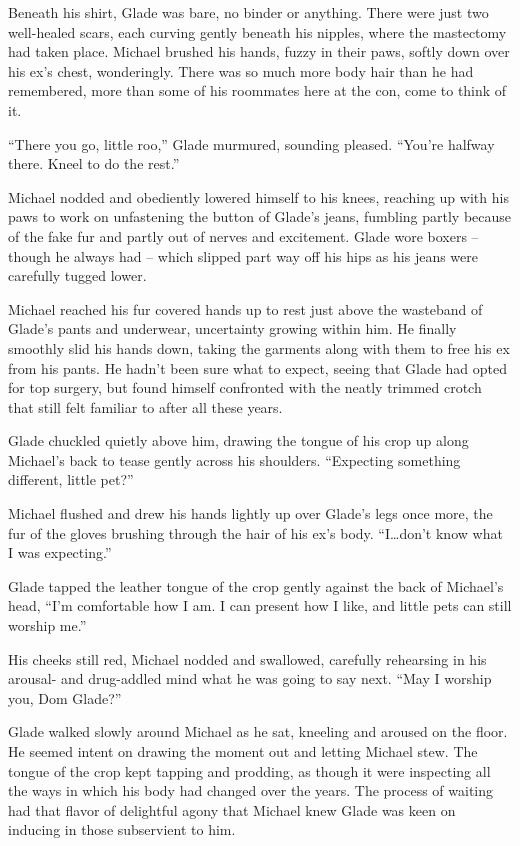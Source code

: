 \documentclass[12pt,letterpaper,oneside]{memoir}
\begin{document}
  Beneath his shirt, Glade was bare, no binder or anything.  There were just two well-healed scars, each curving gently beneath his nipples, where the mastectomy had taken place.  Michael brushed his hands, fuzzy in their paws, softly down over his ex's chest, wonderingly.  There was so much more body hair than he had remembered, more than some of his roommates here at the con, come to think of it.

  ``There you go, little roo,'' Glade murmured, sounding pleased.  ``You're halfway there.  Kneel to do the rest.''

  Michael nodded and obediently lowered himself to his knees, reaching up with his paws to work on unfastening the button of Glade's jeans, fumbling partly because of the fake fur and partly out of nerves and excitement.  Glade wore boxers -- though he always had -- which slipped part way off his hips as his jeans were carefully tugged lower.

  Michael reached his fur covered hands up to rest just above the wasteband of Glade's pants and underwear, uncertainty growing within him.  He finally smoothly slid his hands down, taking the garments along with them to free his ex from his pants.  He hadn't been sure what to expect, seeing that Glade had opted for top surgery, but found himself confronted with the neatly trimmed crotch that still felt familiar to after all these years.

  Glade chuckled quietly above him, drawing the tongue of his crop up along Michael's back to tease gently across his shoulders.  ``Expecting something different, little pet?''

  Michael flushed and drew his hands lightly up over Glade's legs once more, the fur of the gloves brushing through the hair of his ex's body.  ``I\ldots{}don't know what I was expecting.''

  Glade tapped the leather tongue of the crop gently against the back of Michael's head, ``I'm comfortable how I am.  I can present how I like, and little pets can still worship me.''

  His cheeks still red, Michael nodded and swallowed, carefully rehearsing in his arousal- and drug-addled mind what he was going to say next.  ``May I worship you, Dom Glade?''

  Glade walked slowly around Michael as he sat, kneeling and aroused on the floor.  He seemed intent on drawing the moment out and letting Michael stew.  The tongue of the crop kept tapping and prodding, as though it were inspecting all the ways in which his body had changed over the years.  The process of waiting had that flavor of delightful agony that Michael knew Glade was keen on inducing in those subservient to him.
\end{document}
